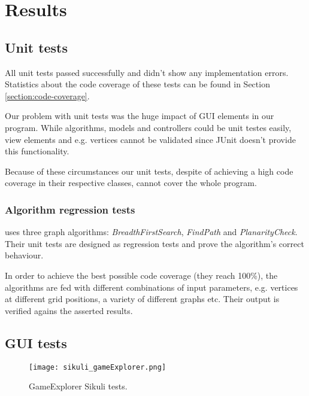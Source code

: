 \section{Results}
\label{section:results}

\subsection{Unit tests}

All unit tests passed successfully and didn't show any implementation errors. Statistics about the code coverage of these tests can be found in Section \ref{section:code-coverage}.\par
Our problem with unit tests was the huge impact of GUI elements in our program. While algorithms, models and controllers could be unit testes easily, view elements and e.g. vertices cannot be validated since JUnit doesn't provide this functionality.\par
Because of these circumstances our unit tests, despite of achieving a high code coverage in their respective classes, cannot cover the whole program.\par

\subsubsection{Algorithm regression tests}

\graphioli uses three graph algorithms: \emph{BreadthFirstSearch}, \emph{FindPath} and \emph{PlanarityCheck}. Their unit tests are designed as regression tests and prove the algorithm's correct behaviour.\par
In order to achieve the best possible code coverage (they reach 100\%), the algorithms are fed with different combinations of input parameters, e.g. vertices at different grid positions, a variety of different graphs etc. Their output is verified agains the asserted results.\par

\subsection{GUI tests}


\begin{figure}[!h]
	\texttt{[image: sikuli\_gameExplorer.png]}
	\caption{GameExplorer Sikuli tests.}
	\label{img:sikuliGameExplorer}
\end{figure}

